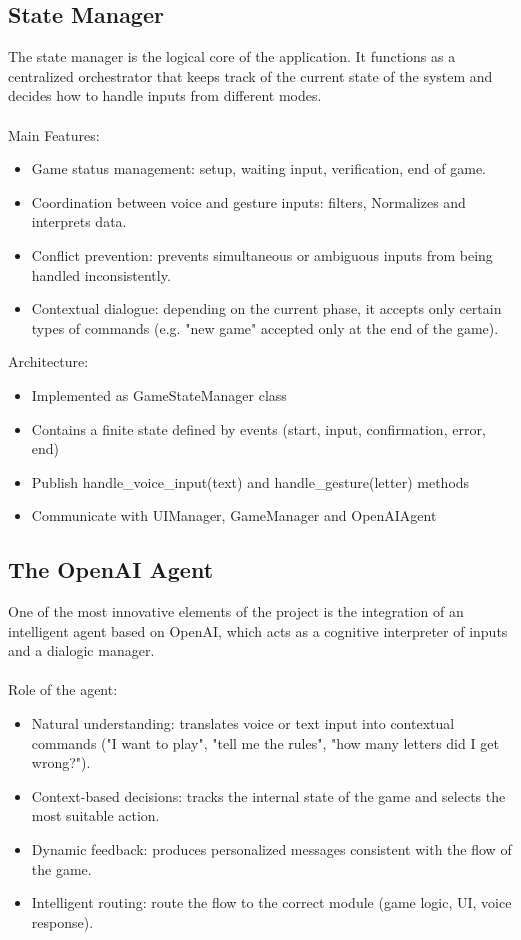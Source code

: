 \subsection{State Manager}
The state manager is the logical core of the application. It functions as a centralized orchestrator that keeps track of the current state of the system and decides how to handle inputs from different modes.\\\\
Main Features:
\begin{itemize}
    \item Game status management: setup, waiting input, verification, end of game.
    \item Coordination between voice and gesture inputs: filters, Normalizes and interprets data.
    \item Conflict prevention: prevents simultaneous or ambiguous inputs from being handled inconsistently.
    \item Contextual dialogue: depending on the current phase, it accepts only certain types of commands (e.g. "new game" accepted only at the end of the game).
\end{itemize}

Architecture:
\begin{itemize}
    \item Implemented as GameStateManager class
    \item Contains a finite state defined by events (start, input, confirmation, error, end)
    \item Publish handle\_voice\_input(text) and handle\_gesture(letter) methods
    \item Communicate with UIManager, GameManager and OpenAIAgent
\end{itemize}

\subsection{The OpenAI Agent}
One of the most innovative elements of the project is the integration of an intelligent agent based on OpenAI, which acts as a cognitive interpreter of inputs and a dialogic manager.\\\\
Role of the agent:
\begin{itemize}
    \item Natural understanding: translates voice or text input into contextual commands ("I want to play", "tell me the rules", "how many letters did I get wrong?").
    \item Context-based decisions: tracks the internal state of the game and selects the most suitable action.
    \item Dynamic feedback: produces personalized messages consistent with the flow of the game.
    \item Intelligent routing: route the flow to the correct module (game logic, UI, voice response).
\end{itemize}

